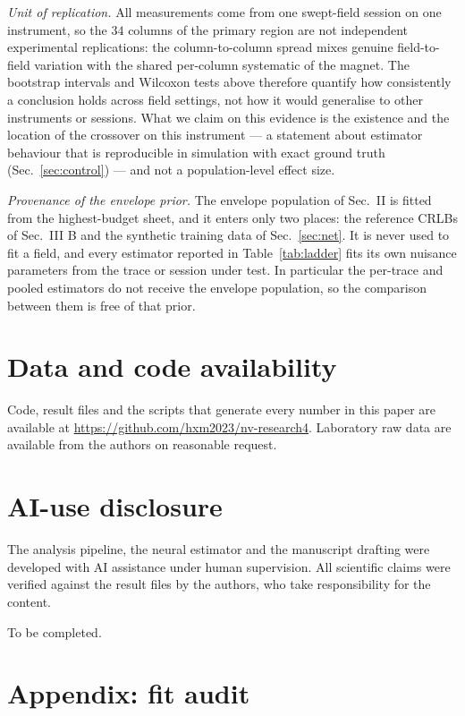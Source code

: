 \documentclass[aps,pra,twocolumn,superscriptaddress,nofootinbib]{revtex4-2}
\begin{document}
\emph{Unit of replication.} All measurements come from one swept-field session on one
instrument, so the $34$ columns of the primary region are not independent experimental
replications: the column-to-column spread mixes genuine field-to-field variation with the
shared per-column systematic of the magnet. The bootstrap intervals and Wilcoxon tests
above therefore quantify how consistently a conclusion holds across field settings, not how
it would generalise to other instruments or sessions. What we claim on this evidence is the
existence and the location of the crossover on this instrument --- a statement about
estimator behaviour that is reproducible in simulation with exact ground truth
(Sec.~\ref{sec:control}) --- and not a population-level effect size.

\emph{Provenance of the envelope prior.} The envelope population of
Sec.~II is fitted from the highest-budget sheet, and it enters only two places: the
reference CRLBs of Sec.~III B and the synthetic training data of Sec.~\ref{sec:net}. It is
never used to fit a field, and every estimator reported in Table~\ref{tab:ladder} fits its
own nuisance parameters from the trace or session under test. In particular the per-trace
and pooled estimators do not receive the envelope population, so the comparison between
them is free of that prior.

\section*{Data and code availability}
Code, result files and the scripts that generate every number in this paper are available at
\url{https://github.com/hxm2023/nv-research4}. Laboratory raw data are available from the
authors on reasonable request.

\section*{AI-use disclosure}
The analysis pipeline, the neural estimator and the manuscript drafting were developed with
AI assistance under human supervision. All scientific claims were verified against the
result files by the authors, who take responsibility for the content.

\begin{acknowledgments}
To be completed.
\end{acknowledgments}

\section*{Appendix: fit audit}
\label{app:audit}
\end{document}
